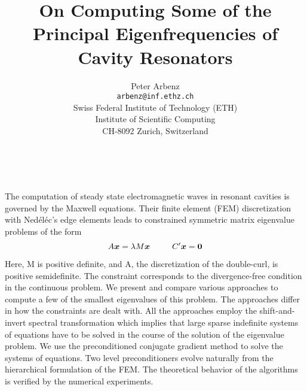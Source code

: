 \documentclass[11pt]{article}
\date{ ~ \hspace{-4mm}}
\title{On Computing Some of the Principal Eigenfrequencies of Cavity Resonators  }
\author{Peter Arbenz \\ {\tt arbenz@inf.ethz.ch} \\    Swiss Federal Institute of Technology (ETH)  \\  Institute of Scientific Computing  \\  CH-8092 Zurich, Switzerland}
\begin{document}
\maketitle
\thispagestyle{empty}





The computation of steady state electromagnetic waves in resonant cavities
is governed by the Maxwell equations. Their finite element (FEM) discretization
with Ned\'{e}l\'{e}c's edge elements leads to constrained symmetric
matrix eigenvalue problems of the form
$$ A \mbox{\boldmath $x$} = \lambda M \mbox{\boldmath $x$}
~~~~~~~~
C'\mbox{\boldmath $x$}=\mbox{\boldmath $0$} $$




Here, M is positive definite, and A, the discretization of the double-curl,
is positive semidefinite. The constraint corresponds to the divergence-free
condition in the continuous problem. We present and compare various approaches
to compute a few of the smallest eigenvalues of this problem. The approaches
differ in how the constraints are dealt with. All the approaches employ
the shift-and-invert spectral transformation which implies that large sparse
indefinite systems of equations have to be solved in the course of the
solution of the eigenvalue problem. We use the preconditioned conjugate
gradient method to solve the systems of equations. Two level preconditioners
evolve naturally from the hierarchical formulation of the FEM. The theoretical
behavior of the algorithms is verified by the numerical experiments.
\end{document}
